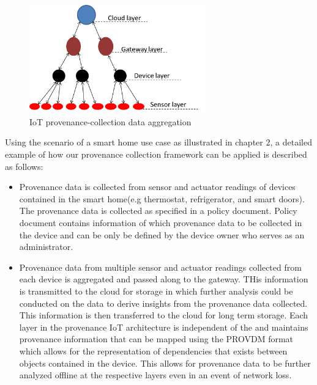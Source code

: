 \begin{figure}[h!]
\begin{center}

\includegraphics[width=3.0in]{iot.PNG}    
\end{center}
\caption{IoT provenance-collection data aggregation}
\label{aggregation}
\end{figure}


Using the scenario of a smart home use case as illustrated in chapter 2, a detailed example of how our provenance collection framework can be applied is described as follows:

\begin{itemize}

\item Provenance data is collected from sensor and actuator readings of devices contained in the smart home(e.g thermostat, refrigerator, and smart doors). The provenance data is collected as specified in a policy document. Policy document contains information of which provenance data to be collected in the device and can be only be defined by the device owner who serves as an administrator. 

\item Provenance data from multiple sensor and actuator readings collected from each device is aggregated and passed along to the gateway. THis information is transmitted to the cloud for storage in which further analysis could be conducted on the data to derive insights from the provenance data collected. This information is then transferred to the cloud for long term storage. Each layer in the provenance IoT architecture is independent of the and maintains provenance information that can be mapped using the PROV\-DM format which allows for the representation of dependencies that exists between objects contained in the device. This allows for provenance data to be further analyzed offline at the respective layers even in an event of network loss. 

\end{itemize}





